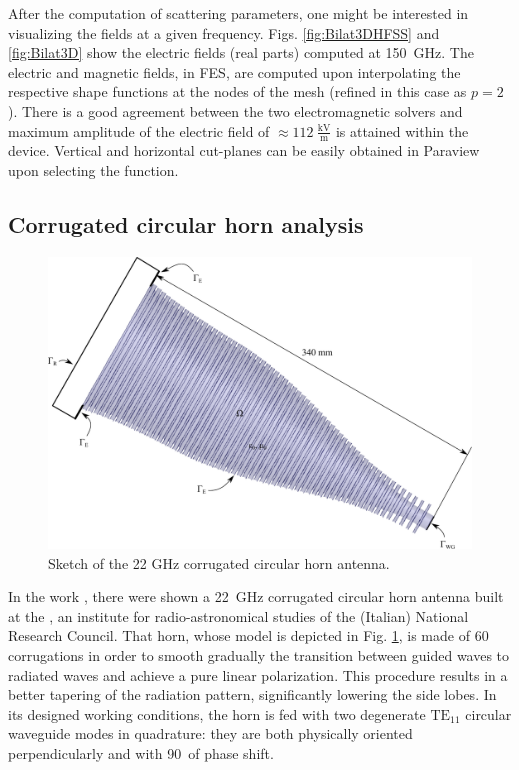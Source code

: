 After the computation of scattering parameters, one might be interested in visualizing the fields at a given frequency. Figs. \ref{fig:Bilat3DHFSS} and \ref{fig:Bilat3D} show the electric fields (real parts) computed at 150~GHz. The electric and magnetic fields, in FES, are computed upon interpolating the respective shape functions at the nodes of the mesh (refined in this case as $p=2$). There is a good agreement between the two electromagnetic solvers and maximum amplitude of the electric field of $\approx 112~\frac{\mathrm{kV}}{\mathrm{m}}$ is attained within the device. Vertical and horizontal cut-planes can be easily obtained in Paraview upon selecting the  function. 

\subsection{Corrugated circular horn analysis} \label{sec:Horn}

\begin{figure}[ht!]
\centering
\includegraphics[width=15cm]{CircHornSketch}
\caption{Sketch of the 22 GHz corrugated circular horn antenna.}
\label{fig:CircHornSketch}
\end{figure}

In the work \cite{lucci2005corrugated}, there were shown a 22~GHz corrugated circular horn antenna built at the , an institute for radio-astronomical studies of the (Italian) National Research Council. That horn,  whose model is depicted in Fig. \ref{fig:CircHornSketch}, is made of 60 corrugations in order to smooth gradually the transition between guided waves to radiated waves and achieve a pure linear polarization. This procedure results in a better tapering of the radiation pattern, significantly lowering the side lobes. In its designed working conditions, the horn is fed with two degenerate $\mathrm{TE}_{11}$ circular waveguide modes in quadrature: they are both physically oriented perpendicularly and with 90\textdegree~of phase shift.

